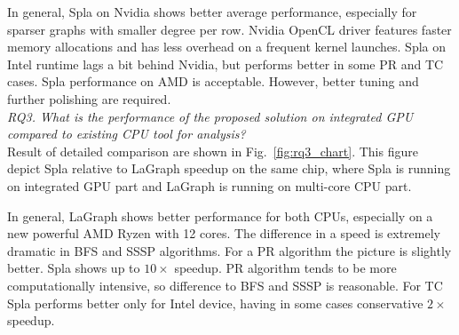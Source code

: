In general, Spla on Nvidia shows better average performance, especially for sparser graphs with smaller degree per row. Nvidia OpenCL driver features faster memory allocations and has less overhead on a frequent kernel launches. Spla on Intel runtime lags a bit behind Nvidia, but performs better in some PR and TC cases. Spla performance on AMD is acceptable. However, better tuning and further polishing are required.\\

\textit{RQ3. What is the performance of the proposed solution on integrated GPU compared to existing CPU tool for analysis?}\\

Result of detailed comparison are shown in Fig.~\ref{fig:rq3_chart}. This figure depict Spla relative to LaGraph speedup on the same chip, where Spla is running on integrated GPU part and LaGraph is running on multi-core CPU part. 

In general, LaGraph shows better performance for both CPUs, especially on a new powerful AMD Ryzen with 12 cores. The difference in a speed is extremely dramatic in BFS and SSSP algorithms. For a PR algorithm the picture is slightly better. Spla shows up to $10\times$ speedup. PR algorithm tends to be more computationally intensive, so difference to BFS and SSSP is reasonable. For TC Spla performs better only for Intel device, having in some cases conservative $2\times$ speedup. 



